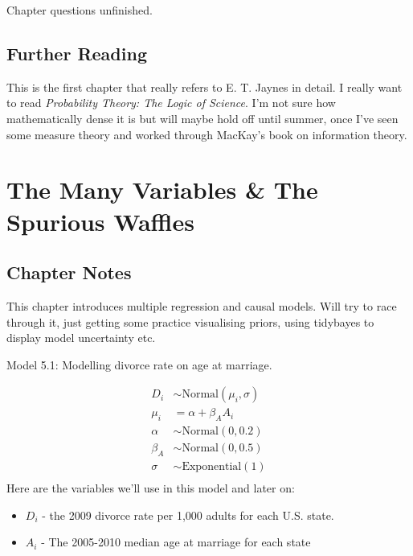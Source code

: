 \documentclass[
]{book}
\providecommand{\tightlist}{%
  \setlength{\itemsep}{0pt}\setlength{\parskip}{0pt}}
\begin{document}
Chapter questions unfinished.

\hypertarget{further-reading-3}{%
\section*{Further Reading}\label{further-reading-3}}

This is the first chapter that really refers to E. T. Jaynes in detail. I really want to read \emph{Probability Theory: The Logic of Science}. I'm not sure how mathematically dense it is but will maybe hold off until summer, once I've seen some measure theory and worked through MacKay's book on information theory.

\hypertarget{many_variables}{%
\chapter{The Many Variables \& The Spurious Waffles}\label{many_variables}}

\hypertarget{chapter-notes-4}{%
\section{Chapter Notes}\label{chapter-notes-4}}

This chapter introduces multiple regression and causal models. Will try to race through it, just getting some practice visualising priors, using tidybayes to display model uncertainty etc.

Model 5.1: Modelling divorce rate on age at marriage.

\[
\begin{aligned}
D_i &\sim \text{Normal}(\mu_i, \sigma) \\
\mu_i &= \alpha + \beta_A A_i \\
\alpha &\sim \text{Normal}(0, 0.2) \\ 
\beta_A &\sim \text{Normal}(0, 0.5) \\
\sigma &\sim \text{Exponential}(1) \\
\end{aligned}
\]
Here are the variables we'll use in this model and later on:

\begin{itemize}
\tightlist
\item
  \(D_i\) - the 2009 divorce rate per 1,000 adults for each U.S. state.
\item
  \(A_i\) - The 2005-2010 median age at marriage for each state
\end{itemize}
\end{document}
